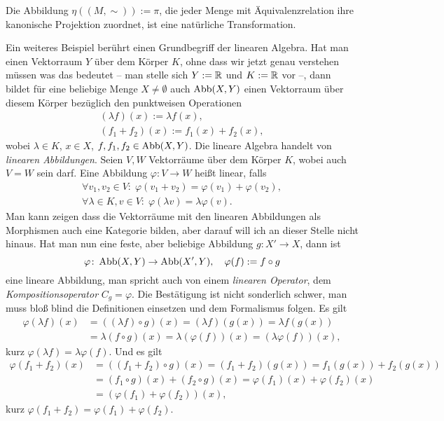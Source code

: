 Die Abbildung $\eta((M,\sim)):=\pi$, die jeder Menge mit
Äquivalenzrelation ihre kanonische Projektion zuordnet,
ist eine natürliche Transformation.

Ein weiteres Beispiel berührt einen Grundbegriff der linearen Algebra.
Hat man einen Vektorraum $Y$ über dem Körper $K$, ohne dass wir jetzt
genau verstehen müssen was das bedeutet -- man stelle sich $Y:=\mathbb R$
und $K:=\mathbb R$ vor --, dann bildet für eine beliebige Menge $X\ne\emptyset$
auch $\operatorname{Abb}(X,Y)$ einen Vektorraum über diesem Körper bezüglich den
punktweisen Operationen%
\begin{gather*}
(\lambda f)(x) := \lambda f(x),\\
(f_1+f_2)(x) := f_1(x)+f_2(x),
\end{gather*} 
wobei $\lambda\in K$, $x\in X$, $f,f_1,f_2\in\operatorname{Abb}(X,Y)$. Die lineare
Algebra handelt von \emph{linearen Abbildungen}. Seien $V,W$
Vektorräume über dem Körper $K$, wobei auch $V=W$ sein darf. Eine
Abbildung $\varphi\colon V\to W$ heißt linear, falls%
\begin{gather*}
\forall v_1,v_2\in V\colon\;\varphi(v_1+v_2) = \varphi(v_1)+\varphi(v_2),\\
\forall \lambda\in K,v\in V\colon\;\varphi(\lambda v) = \lambda\varphi(v).
\end{gather*}
Man kann zeigen dass die Vektorräume mit den linearen Abbildungen
als Morphismen auch eine Kategorie bilden, aber darauf will ich an
dieser Stelle nicht hinaus. Hat man nun eine feste, aber beliebige
Abbildung $g\colon X'\to X$, dann ist%
\[\varphi\colon\operatorname{Abb}(X,Y)\to\operatorname{Abb}(X',Y),\quad \varphi(f):=f\circ g\]
eine lineare Abbildung, man spricht auch von einem
\emph{linearen Operator}, dem \emph{Kompositionsoperator}
$C_g=\varphi$. Die Bestätigung ist nicht sonderlich schwer, man
muss bloß blind die Definitionen einsetzen und dem Formalismus
folgen. Es gilt%
\begin{align*}
\varphi(\lambda f)(x) &= ((\lambda f)\circ g)(x)
= (\lambda f)(g(x)) = \lambda f(g(x))\\
&= \lambda (f\circ g)(x) = \lambda (\varphi(f))(x)
= (\lambda\varphi(f))(x),
\end{align*}
kurz $\varphi(\lambda f)=\lambda\varphi(f)$. Und es gilt
\begin{align*}
\varphi(f_1+f_2)(x) &= ((f_1+f_2)\circ g)(x)
= (f_1+f_2)(g(x)) = f_1(g(x)) + f_2(g(x))\\
&= (f_1\circ g)(x) + (f_2\circ g)(x)
= \varphi(f_1)(x)+\varphi(f_2)(x)\\
&= (\varphi(f_1)+\varphi(f_2))(x),
\end{align*}
kurz $\varphi(f_1+f_2)=\varphi(f_1)+\varphi(f_2)$.

